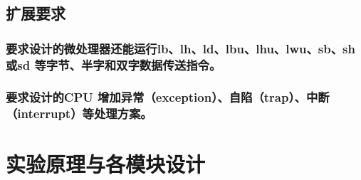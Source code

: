 \documentclass{../source/zjureport}
\begin{document}
        \subsection{扩展要求}
            \subsubsection{要求设计的微处理器还能运行lb、lh、ld、lbu、lhu、lwu、sb、sh 或sd 等字节、半字和双字数据传送指令。}
            \subsubsection{要求设计的CPU 增加异常（exception）、自陷（trap）、中断（interrupt）等处理方案。}
        
    \section{实验原理与各模块设计}
\end{document}
